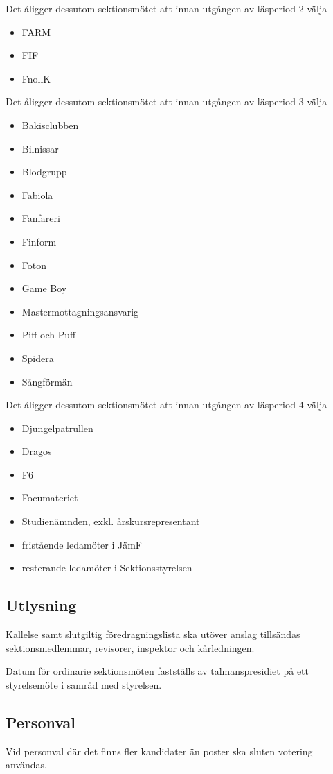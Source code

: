 \documentclass{styrdokument}
\begin{document}
\? Det åligger dessutom sektionsmötet att innan utgången av läsperiod 2 välja
\begin{itemize}
    \item FARM
    \item FIF
    \item FnollK
\end{itemize}

\? Det åligger dessutom sektionsmötet att innan utgången av läsperiod 3 välja
\begin{itemize}
    \item Bakisclubben
    \item Bilnissar
    \item Blodgrupp
    \item Fabiola
    \item Fanfareri
    \item Finform
    \item Foton
    \item Game Boy
    \item Mastermottagningsansvarig
    \item Piff och Puff
    \item Spidera
    \item Sångförmän
\end{itemize}

\? Det åligger dessutom sektionsmötet att innan utgången av läsperiod 4 välja
\begin{itemize}
    \item Djungelpatrullen
    \item Dragos
    \item F6
    \item Focumateriet
    \item Studienämnden, exkl. årskursrepresentant
    \item fristående ledamöter i JämF
    \item resterande ledamöter i Sektionsstyrelsen
\end{itemize}

\subsection{Utlysning}
\? Kallelse samt slutgiltig föredragningslista ska utöver anslag tillsändas sektionsmedlemmar, revisorer, inspektor och kårledningen.

\? Datum för ordinarie sektionsmöten fastställs av talmanspresidiet på ett styrelsemöte i samråd med styrelsen.

\subsection{Personval}
\? Vid personval där det finns fler kandidater än poster ska sluten votering användas.
\end{document}
